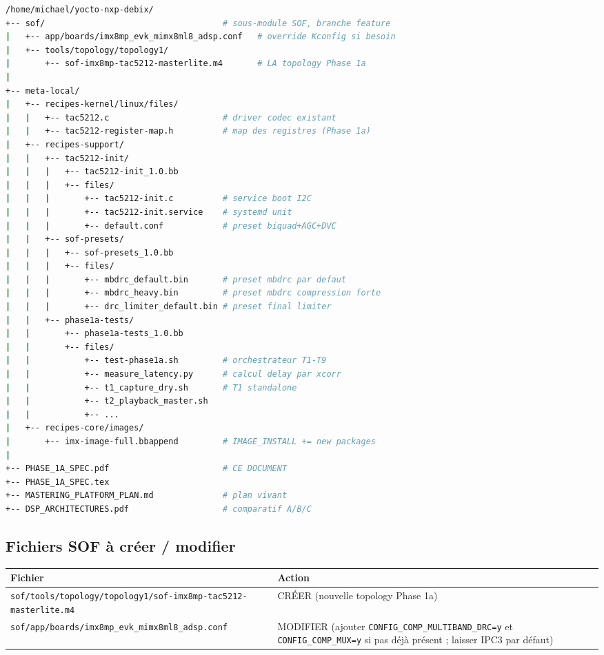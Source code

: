 \documentclass[11pt,a4paper]{article}
\begin{document}
\begin{lstlisting}[language=bash]
/home/michael/yocto-nxp-debix/
+-- sof/                                    # sous-module SOF, branche feature
|   +-- app/boards/imx8mp_evk_mimx8ml8_adsp.conf   # override Kconfig si besoin
|   +-- tools/topology/topology1/
|       +-- sof-imx8mp-tac5212-masterlite.m4       # LA topology Phase 1a
|
+-- meta-local/
|   +-- recipes-kernel/linux/files/
|   |   +-- tac5212.c                       # driver codec existant
|   |   +-- tac5212-register-map.h          # map des registres (Phase 1a)
|   +-- recipes-support/
|   |   +-- tac5212-init/
|   |   |   +-- tac5212-init_1.0.bb
|   |   |   +-- files/
|   |   |       +-- tac5212-init.c          # service boot I2C
|   |   |       +-- tac5212-init.service    # systemd unit
|   |   |       +-- default.conf            # preset biquad+AGC+DVC
|   |   +-- sof-presets/
|   |   |   +-- sof-presets_1.0.bb
|   |   |   +-- files/
|   |   |       +-- mbdrc_default.bin       # preset mbdrc par defaut
|   |   |       +-- mbdrc_heavy.bin         # preset mbdrc compression forte
|   |   |       +-- drc_limiter_default.bin # preset final limiter
|   |   +-- phase1a-tests/
|   |       +-- phase1a-tests_1.0.bb
|   |       +-- files/
|   |           +-- test-phase1a.sh         # orchestrateur T1-T9
|   |           +-- measure_latency.py      # calcul delay par xcorr
|   |           +-- t1_capture_dry.sh       # T1 standalone
|   |           +-- t2_playback_master.sh
|   |           +-- ...
|   +-- recipes-core/images/
|       +-- imx-image-full.bbappend         # IMAGE_INSTALL += new packages
|
+-- PHASE_1A_SPEC.pdf                       # CE DOCUMENT
+-- PHASE_1A_SPEC.tex
+-- MASTERING_PLATFORM_PLAN.md              # plan vivant
+-- DSP_ARCHITECTURES.pdf                   # comparatif A/B/C
\end{lstlisting}

\subsection{Fichiers SOF à créer / modifier}

\begin{center}
\begin{tabularx}{\textwidth}{lX}
\toprule
\textbf{Fichier} & \textbf{Action} \\
\midrule
\texttt{sof/tools/topology/topology1/sof-imx8mp-tac5212-masterlite.m4} & CRÉER (nouvelle topology Phase 1a) \\
\texttt{sof/app/boards/imx8mp\_evk\_mimx8ml8\_adsp.conf} & MODIFIER (ajouter \texttt{CONFIG\_COMP\_MULTIBAND\_DRC=y} et \texttt{CONFIG\_COMP\_MUX=y} si pas déjà présent ; laisser IPC3 par défaut) \\
\bottomrule
\end{tabularx}
\end{center}
\end{document}
